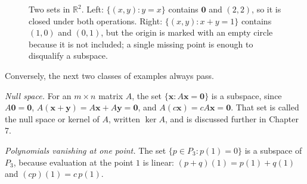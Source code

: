 \begin{figure}[htbp]
\centering
{}
\caption{Two sets in $\mathbb{R}^{2}$. Left: $\{(x,y):y=x\}$ contains $\mathbf{0}$ and
$(2,2)$, so it is closed under both operations. Right: $\{(x,y):x+y=1\}$ contains $(1,0)$ and
$(0,1)$, but the origin is marked with an empty circle because it is not included; a single
missing point is enough to disqualify a subspace.}
\label{fig:ch06-garis}
\end{figure}



Conversely, the next two classes of examples always pass.

\emph{Null space.} For an $m\times n$ matrix $A$, the set
$\{\mathbf{x}:A\mathbf{x}=\mathbf{0}\}$ is a subspace, since $A\mathbf{0}=\mathbf{0}$,
$A(\mathbf{x}+\mathbf{y})=A\mathbf{x}+A\mathbf{y}=\mathbf{0}$, and
$A(c\mathbf{x})=cA\mathbf{x}=\mathbf{0}$. That set is called the null space or kernel of $A$,
written $\ker A$, and is discussed further in Chapter 7.

\emph{Polynomials vanishing at one point.} The set
$\{p\in P_{3}:p(1)=0\}$ is a subspace of $P_{3}$, because evaluation at the point $1$ is linear:
$(p+q)(1)=p(1)+q(1)$ and $(cp)(1)=c\,p(1)$.

